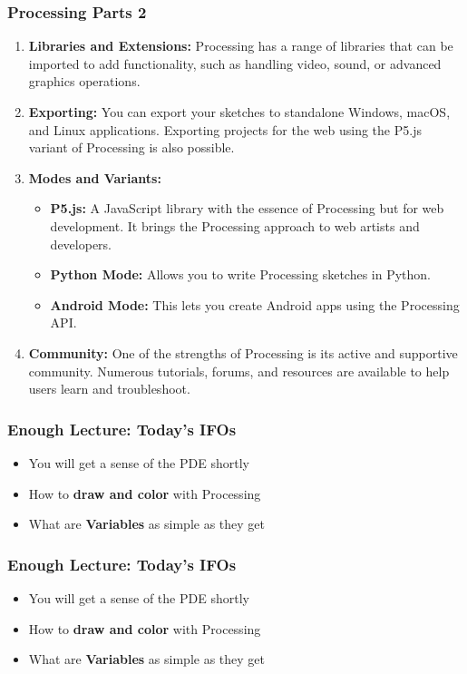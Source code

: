 \documentclass[10pt]{beamer}
\begin{document}
\begin{frame}
\frametitle{Processing Parts 2}
\begin{enumerate}
\item
  \textbf{Libraries and Extensions:} Processing has a range of libraries
  that can be imported to add functionality, such as handling video,
  sound, or advanced graphics operations.
\item
  \textbf{Exporting:} You can export your sketches to standalone
  Windows, macOS, and Linux applications. Exporting projects for the web
  using the P5.js variant of Processing is also possible.
\item
  \textbf{Modes and Variants:}

  \begin{itemize}
  \item
    \textbf{P5.js:} A JavaScript library with the essence of Processing
    but for web development. It brings the Processing approach to web
    artists and developers.
  \item
    \textbf{Python Mode:} Allows you to write Processing sketches in
    Python.
  \item
    \textbf{Android Mode:} This lets you create Android apps using the
    Processing API.
  \end{itemize}
\item
  \textbf{Community:} One of the strengths of Processing is its active
  and supportive community. Numerous tutorials, forums, and resources
  are available to help users learn and troubleshoot.
\end{enumerate}
\end{frame}


\begin{frame}
\frametitle{Enough Lecture: Today's IFOs}
\begin{itemize}
\item{You will get a sense of the PDE shortly}
\item{How to \textbf{draw and color} with Processing}
\item{What are \textbf{Variables} as simple as they get}
\end{itemize}
\end{frame}


\begin{frame}
\frametitle{Enough Lecture: Today's IFOs}
\begin{itemize}
\item{You will get a sense of the PDE shortly}
\item{How to \textbf{draw and color} with Processing}
\item{What are \textbf{Variables} as simple as they get}
\end{itemize}
\end{frame}
\end{document}

